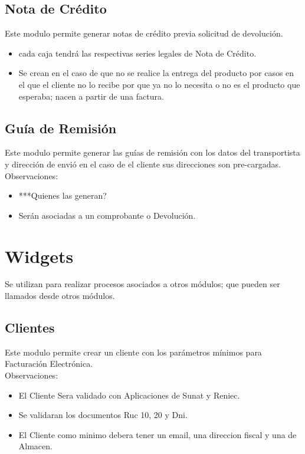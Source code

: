 \documentclass[pdftex,12pt,oneside,a4paper,spanish, english, brazil]{abntex2}
\begin{document}
\begin{sloppypar}
              \subsection{Nota de Crédito}
              Este modulo permite generar notas de crédito previa solicitud de devolución.
              \begin{itemize}
              	\item cada caja tendrá las respectivas series legales de Nota de Crédito.
              	\item Se crean en el caso de que no se realice la entrega del producto por casos en el que el cliente no lo recibe por que ya no lo necesita o no es el producto que esperaba; nacen a partir de una factura.
              \end{itemize}
              \subsection{Guía de Remisión}
              Este modulo permite generar las guías de remisión con los datos del transportista y dirección de envió en el caso de el cliente sus direcciones son pre-cargadas.\\
              Observaciones:
              \begin{itemize}
              	\item ***Quienes las generan?
              	\item Serán asociadas a un comprobante o Devolución.
              \end{itemize}
          \section{Widgets}
          Se utilizan para realizar procesos asociados a otros módulos; que pueden ser llamados desde otros módulos.
          \subsection{Clientes}
          Este modulo permite crear un cliente con los parámetros mínimos para Facturación Electrónica.\\
          Observaciones:
          \begin{itemize}
          	\item El Cliente Sera validado con Aplicaciones de Sunat y Reniec.
          	\item Se validaran los documentos Ruc 10, 20 y Dni.
          	\item El Cliente como minimo debera tener un email, una direccion fiscal y una de Almacen.
          \end{itemize}
    \end{sloppypar}
\end{document}
